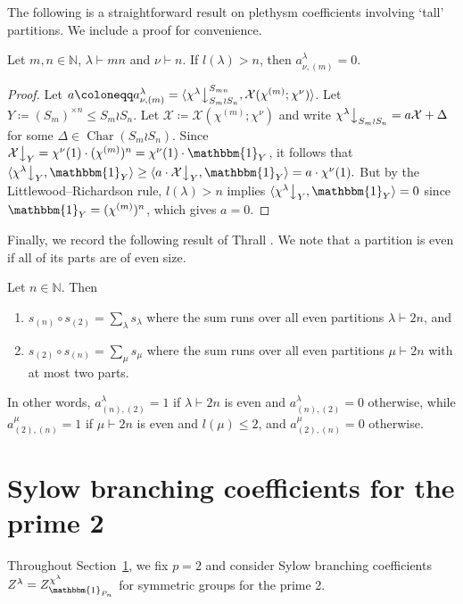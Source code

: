 \documentclass[ALCO, Unicode]{cedram}
\newcommand{\triv}{\mathbbm{1}}
\newcommand{\Ch}{\operatorname{Char}}
\newcommand{\down}{\big\downarrow}
\newcommand{\cX}{\mathcal{X}}
\newcommand{\N}{\mathbb{N}}
\begin{document}
The following is a straightforward result on plethysm coefficients involving `tall' partitions. We include a proof for convenience.
\begin{lemma}\label{lem:tall-pleth}
	Let $m,n\in\N$, $\lambda\vdash mn$ and $\nu\vdash n$. If $l(\lambda)>n$, then $a^\lambda_{\nu,(m)}=0$.
\end{lemma}

\begin{proof}
	Let $a\coloneqq a^\lambda_{\nu,(m)}= \langle \chi^\lambda\down^{S_{mn}}_{S_m\wr S_n}, \cX(\chi^{(m)};\chi^\nu)\rangle$. Let $Y\coloneqq (S_m)^{\times n}\le S_m\wr S_n$. 
	Let $\cX\coloneqq \cX(\chi^{(m)};\chi^\nu)$ and write $\chi^\lambda\down_{S_m\wr S_n} = a\cX + \Delta$ for some $\Delta\in\Ch(S_m\wr S_n)$. Since $\cX\down_Y = \chi^\nu(1)\cdot(\chi^{(m)})^n=\chi^\nu(1)\cdot\triv_Y$, it follows that $\langle \chi^\lambda\down_Y,\triv_Y\rangle \ge \langle a\cdot \cX\down_Y, \triv_Y\rangle = a\cdot\chi^\nu(1).$
	But by the Littlewood--Richardson rule, $l(\lambda)>n$ implies $\langle \chi^\lambda\down_Y,\triv_Y\rangle=0$ since $\triv_Y = (\chi^{(m)})^n$, which gives $a=0$.
\end{proof}

Finally, we record the following result of Thrall \cite{T}. We note that a partition is even if all of its parts are of even size.
\begin{proposition}\label{prop:thrall}
	Let $n\in\N$. Then 
	\begin{enumerate}[label=\textup{(\roman*)}]
		\item $s_{(n)}\circ s_{(2)} = \sum_\lambda s_\lambda$ where the sum runs over all even partitions $\lambda\vdash 2n$, and
		\item $s_{(2)}\circ s_{(n)} = \sum_\mu s_\mu$ where the sum runs over all even partitions $\mu\vdash 2n$ with at most two parts.
	\end{enumerate}
\end{proposition}
In other words, $a^\lambda_{(n),(2)}=1$ if $\lambda\vdash 2n$ is even and $a^\lambda_{(n),(2)}=0$ otherwise, while $a^\mu_{(2),(n)}=1$ if $\mu\vdash 2n$ is even and $l(\mu)\le 2$, and $a^\mu_{(2),(n)}=0$ otherwise.



\section{Sylow branching coefficients for the prime 2}\label{sec:sbc}
Throughout Section~\ref{sec:sbc}, we fix $p=2$ and consider Sylow branching coefficients $Z^\lambda=Z^{\chi^\lambda}_{\triv_{P_n}}$ for symmetric groups for the prime 2.
\end{document}

